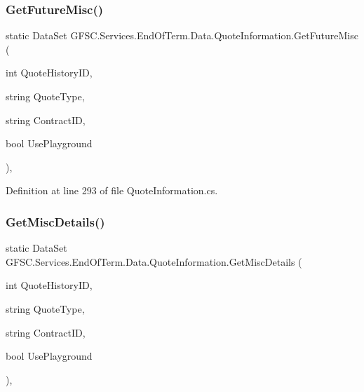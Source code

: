 \subsubsection{\texorpdfstring{Get\+Future\+Misc()}{GetFutureMisc()}}
{\footnotesize\ttfamily static Data\+Set G\+F\+S\+C.\+Services.\+End\+Of\+Term.\+Data.\+Quote\+Information.\+Get\+Future\+Misc (\begin{DoxyParamCaption}\item[{int}]{Quote\+History\+ID,  }\item[{string}]{Quote\+Type,  }\item[{string}]{Contract\+ID,  }\item[{bool}]{Use\+Playground }\end{DoxyParamCaption})\hspace{0.3cm}{\ttfamily [static]}, {\ttfamily [package]}}



Definition at line 293 of file Quote\+Information.\+cs.

\mbox{\label{class_g_f_s_c_1_1_services_1_1_end_of_term_1_1_data_1_1_quote_information_ae8c9d719072ec83ae5471f24f5836e03}} 
\subsubsection{\texorpdfstring{Get\+Misc\+Details()}{GetMiscDetails()}}
{\footnotesize\ttfamily static Data\+Set G\+F\+S\+C.\+Services.\+End\+Of\+Term.\+Data.\+Quote\+Information.\+Get\+Misc\+Details (\begin{DoxyParamCaption}\item[{int}]{Quote\+History\+ID,  }\item[{string}]{Quote\+Type,  }\item[{string}]{Contract\+ID,  }\item[{bool}]{Use\+Playground }\end{DoxyParamCaption})\hspace{0.3cm}{\ttfamily [static]}, {\ttfamily [package]}}



